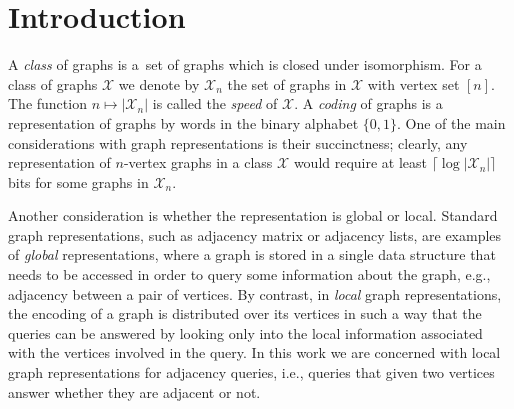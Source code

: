 \documentclass[letterpaper,11pt]{article}
\newcommand{\Xc}{\mathcal{X}}
\theoremstyle{definition}
\theoremstyle{remark}
\begin{document}
 
	
	\section{Introduction}
	\label{sec:new-intro}
	A \emph{class} of graphs is a~set of graphs which is closed under isomorphism. 
	For a class of graphs $\Xc$ we denote by $\Xc_n$ the set of graphs in $\Xc$ with vertex set $[n]$.
	The function $n \mapsto |\Xc_n|$ is called the \emph{speed} of $\Xc$. 
	A \emph{coding} of graphs is a representation of graphs by words in the binary alphabet $\{ 0, 1 \}$.  One of the main considerations with graph representations is their succinctness; clearly, any representation of $n$-vertex graphs in a class $\Xc$ would require at least $\lceil \log |\Xc_n| \rceil$ bits for some graphs in $\Xc_n$.	
	
	Another consideration is whether the representation is global or local. Standard graph representations, such as adjacency matrix or adjacency lists, are examples of \emph{global} representations, where a graph is stored in a single data structure that needs to be accessed in order to query some information about the graph, e.g., adjacency between a pair of vertices. By contrast, in \emph{local} graph representations, the  encoding of a graph is distributed over its vertices in such a way that the queries can be answered by looking only into the local information associated with the vertices involved in the query. In this work we are concerned with local graph representations for adjacency queries, i.e., queries that given two vertices answer whether they are adjacent or not.
	
\end{document}
